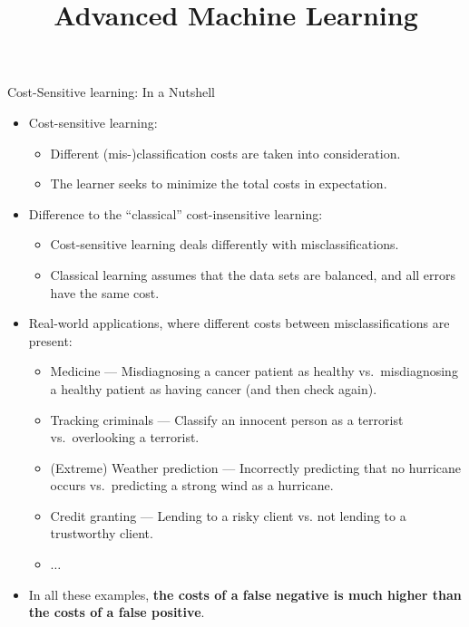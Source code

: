 \documentclass[11pt,compress,t,notes=noshow, xcolor=table]{beamer}
\title{Advanced Machine Learning}
\date{}
\begin{document}



\sloppy


\begin{vbframe}{Cost-Sensitive learning: In a Nutshell}
	\scriptsize{
		\begin{itemize}
%			
		\item Cost-sensitive learning: 
            \begin{itemize}
                \scriptsize
                \item Different (mis-)classification costs are taken into consideration.
                \item The learner seeks to minimize the total costs in expectation.
            \end{itemize}
%
		\item Difference to the ``classical'' cost-insensitive learning: 
            \begin{itemize}
                \scriptsize
                \item Cost-sensitive learning deals differently with misclassifications.
                \item Classical learning assumes that the data sets are balanced, and all errors have the same cost.
            \end{itemize}
		
%
		\item Real-world applications, where different costs between misclassifications are present:
%		
		\begin{itemize}
			\scriptsize
%			
			\item Medicine --- Misdiagnosing a cancer patient as healthy vs.\ misdiagnosing a healthy patient as having cancer (and then check again).
			\item Tracking criminals ---  Classify an innocent person as a terrorist vs.\ overlooking a terrorist.
			\item (Extreme) Weather prediction ---  Incorrectly predicting that no hurricane occurs vs.\ predicting a strong wind as a hurricane.
%			
			\item Credit granting --- Lending to a risky client vs. not lending to a trustworthy client.
			\item $\ldots$
%    	
%			
		\end{itemize}
%	
		\item In all these examples, \textbf{the costs of a false negative is much higher than the costs of a false positive}.
%
		\end{itemize}
		
	}
\end{vbframe}
\end{document}
